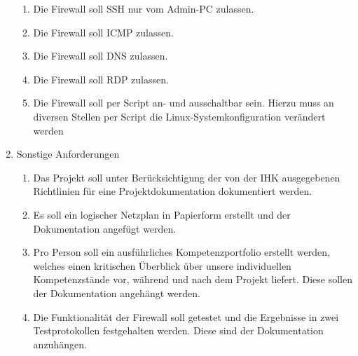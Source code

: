 \begin{enumerate}[itemsep=0em,partopsep=0em,parsep=0em,topsep=0em]
\begin{enumerate}
    \item Die Firewall soll SSH nur vom Admin-PC zulassen.
    \item Die Firewall soll ICMP zulassen.
    \item Die Firewall soll DNS zulassen.
    \item Die Firewall soll RDP zulassen.
    \item Die Firewall soll per Script an- und ausschaltbar sein. Hierzu muss an diversen Stellen per Script die Linux-Systemkonfiguration verändert werden
\end{enumerate}
\item Sonstige Anforderungen
	\begin{enumerate}
	\item Das Projekt soll unter Berücksichtigung der von der IHK ausgegebenen Richtlinien für eine Projektdokumentation dokumentiert werden.
    \item Es soll ein logischer Netzplan in Papierform erstellt und der Dokumentation angefügt werden.
	\item Pro Person soll ein ausführliches Kompetenzportfolio erstellt werden, welches einen kritischen Überblick über unsere individuellen Kompetenzstände vor, während und nach dem Projekt liefert. Diese sollen der Dokumentation angehängt werden.
	\item Die Funktionalität der Firewall soll getestet und die Ergebnisse in zwei Testprotokollen festgehalten werden. Diese sind der Dokumentation anzuhängen.
	\end{enumerate}
\end{enumerate}

